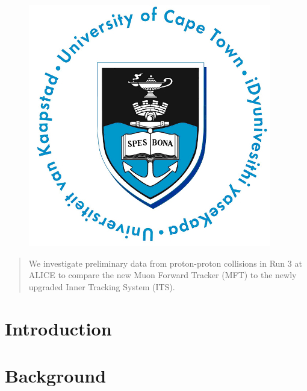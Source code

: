 \documentclass[11pt]{article}
\begin{document}
    
\maketitle

\begin{figure}[h]
    \begin{center}
        \includegraphics{Figs/UCT.jpg}
    \end{center}
\end{figure}

\begin{abstract}
    \centering
    We investigate preliminary data from proton-proton collisions in Run 3 at ALICE to compare the new Muon Forward Tracker (MFT) to the newly upgraded Inner Tracking System (ITS).
\end{abstract}

\newpage
\tableofcontents

\newpage
\section{Introduction}\label{sec:Introduction}
    

\section{Background}\label{sec:Background}





\end{document}
